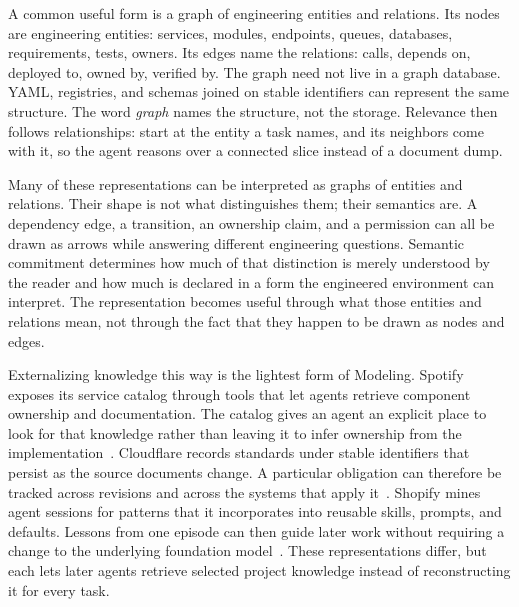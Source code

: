 

A common useful form is a graph of engineering entities and relations. Its nodes are engineering entities: services, modules, endpoints, queues, databases, requirements, tests, owners. Its edges name the relations: calls, depends on, deployed to, owned by, verified by. The graph need not live in a graph database. YAML, registries, and schemas joined on stable identifiers can represent the same structure. The word \emph{graph} names the structure, not the storage. Relevance then follows relationships: start at the entity a task names, and its neighbors come with it, so the agent reasons over a connected slice instead of a document dump.


Many of these representations can be interpreted as graphs of entities and relations. Their shape is not what distinguishes them; their semantics are. A dependency edge, a transition, an ownership claim, and a permission can all be drawn as arrows while answering different engineering questions. Semantic commitment determines how much of that distinction is merely understood by the reader and how much is declared in a form the engineered environment can interpret. The representation becomes useful through what those entities and relations mean, not through the fact that they happen to be drawn as nodes and edges.


Externalizing knowledge this way is the lightest form of Modeling. Spotify exposes its service catalog through tools that let agents retrieve component ownership and documentation. The catalog gives an agent an explicit place to look for that knowledge rather than leaving it to infer ownership from the implementation~\citep{spotify2026constraint}. Cloudflare records standards under stable identifiers that persist as the source documents change. A particular obligation can therefore be tracked across revisions and across the systems that apply it~\citep{reimann2026codex}. Shopify mines agent sessions for patterns that it incorporates into reusable skills, prompts, and defaults. Lessons from one episode can then guide later work without requiring a change to the underlying foundation model~\citep{moreno2026river}. These representations differ, but each lets later agents retrieve selected project knowledge instead of reconstructing it for every task.

